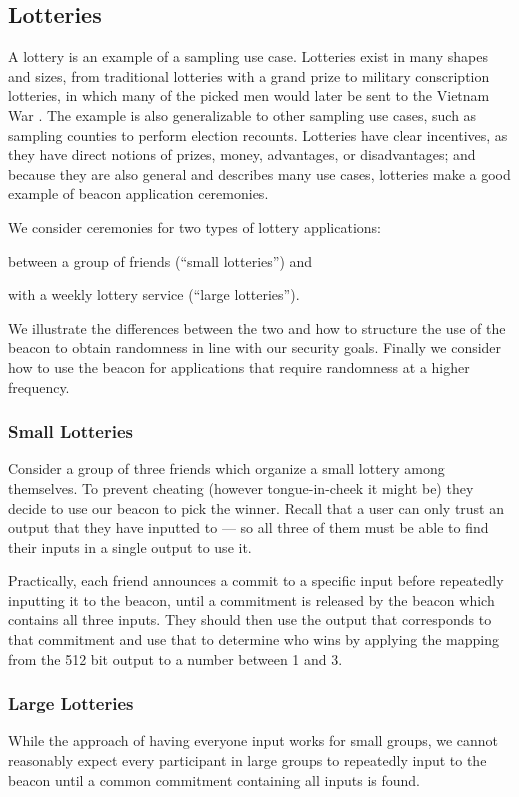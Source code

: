 \subsection{Lotteries}
A lottery is an example of a sampling use case.
Lotteries exist in many shapes and sizes, from traditional lotteries with a grand prize to military conscription lotteries, in which many of the picked men would later be sent to the Vietnam War . The example is also generalizable to other sampling use cases, such as sampling counties to perform election recounts. Lotteries have clear incentives, as they have direct notions of prizes, money, advantages, or disadvantages; and because they are also general and describes many use cases, lotteries make a good example of beacon application ceremonies.

We consider ceremonies for two types of lottery applications:
\begin{eletterate*}
\item between a group of friends (\enquote{small lotteries}) and
\item with a weekly lottery service (\enquote{large lotteries}).
\end{eletterate*}
We illustrate the differences between the two and how to structure the use of the beacon to obtain randomness in line with our security goals.
Finally we consider how to use the beacon for applications that require randomness at a higher frequency.

\subsubsection{Small Lotteries}
Consider a group of three friends which organize a small lottery among themselves.
To prevent cheating (however tongue-in-cheek it might be) they decide to use our beacon to pick the winner.
Recall that a user can only trust an output that they have inputted to --- so all three of them must be able to find their inputs in a single output to use it.

Practically, each friend announces a commit to a specific input before repeatedly inputting it to the beacon, until a commitment is released by the beacon which contains all three inputs.
They should then use the output that corresponds to that commitment and use that to determine who wins by applying the mapping from the 512 bit output to a number between 1 and 3.

\subsubsection{Large Lotteries}%
\label{ssub:large_lotteries}
While the approach of having everyone input works for small groups, we cannot reasonably expect every participant in large groups to repeatedly input to the beacon until a common commitment containing all inputs is found.

